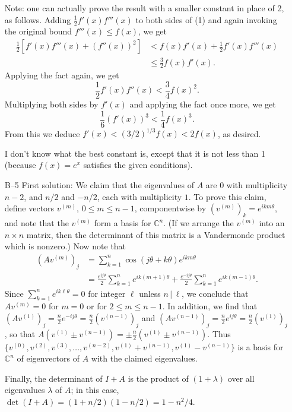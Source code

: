 \documentclass[amssymb,twocolumn,pra,10pt,aps]{revtex4-1}
\newcommand{\CC}{\mathbb{C}}
\begin{document}
\begin{itemize}
Note: one can actually prove the result with a smaller constant in place of
2, as follows. Adding $\frac{1}{2} f'(x) f'''(x)$ to both sides
of (1) and again invoking the original bound
$f'''(x) \leq f(x)$, we get
\begin{align*}
\frac{1}{2} [f'(x) f'''(x) + (f''(x))^2] &< f(x) f'(x) + \frac{1}{2} f'(x) f'''(x) \\
&\leq \frac{3}{2} f(x) f'(x).
\end{align*}
Applying the fact again, we get
\[
\frac{1}{2} f'(x) f''(x) < \frac{3}{4} f(x)^2.
\]
Multiplying both sides by $f'(x)$ and applying the fact once more, we get
\[
\frac{1}{6} (f'(x))^3 < \frac{1}{4} f(x)^3.
\]
From this we deduce $f'(x) < (3/2)^{1/3} f(x) < 2f(x)$, as desired.

I don't know what the best constant is, except that it is not less than 1
(because $f(x) = e^x$ satisfies the given conditions).

\item[B--5]
First solution:
We claim that the eigenvalues of $A$ are $0$ with multiplicity $n-2$,
and $n/2$ and $-n/2$, each with multiplicity $1$.  To prove this claim,
define vectors $v^{(m)}$, $0\leq m\leq n-1$, componentwise by
$(v^{(m)})_k = e^{ikm\theta}$, and note that the $v^{(m)}$ form a basis
for $\CC^n$.  (If we arrange the $v^{(m)}$ into an $n\times n$ matrix,
then the determinant of this matrix is a Vandermonde product which is
nonzero.)  Now note that
\begin{align*}
(Av^{(m)})_j &= \sum_{k=1}^n \cos(j\theta+k\theta) e^{ikm\theta} \\
&= \frac{e^{ij\theta}}{2} \sum_{k=1}^n e^{ik(m+1)\theta}
+ \frac{e^{-ij\theta}}{2} \sum_{k=1}^n e^{ik(m-1)\theta}.
\end{align*}
Since $\sum_{k=1}^n e^{ik\ell\theta} = 0$ for integer $\ell$ unless
$n\,|\,\ell$, we conclude that $Av^{(m)}=0$ for $m=0$ or for
$2 \leq m \leq n-1$.  In addition, we find that $(Av^{(1)})_j =
\frac{n}{2} e^{-ij\theta} = \frac{n}{2}(v^{(n-1)})_j$ and $(Av^{(n-1)})_j =
\frac{n}{2} e^{ij\theta} = \frac{n}{2}(v^{(1)})_j$, so that
$A(v^{(1)} \pm v^{(n-1)}) = \pm \frac{n}{2} (v^{(1)} \pm v^{(n-1)})$.
Thus $\{v^{(0)},v^{(2)},v^{(3)},\ldots,v^{(n-2)},
v^{(1)}+v^{(n-1)},v^{(1)}-v^{(n-1)}\}$ is a basis for $\CC^n$ of
eigenvectors of $A$ with the claimed eigenvalues.

Finally, the determinant of $I+A$ is the product of $(1+\lambda)$
over all eigenvalues $\lambda$ of $A$; in this case,
$\det (I+A) = (1+n/2)(1-n/2) = 1-n^2/4$.


\end{itemize}
\end{document}
